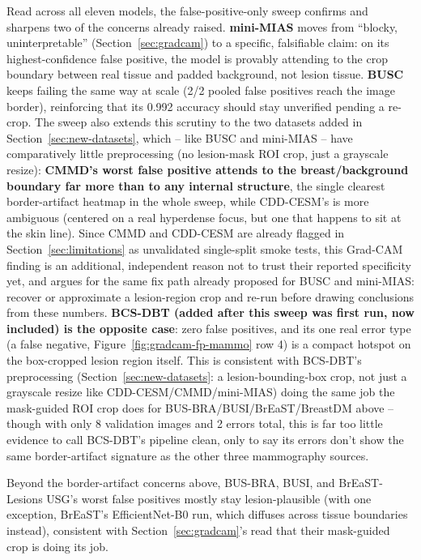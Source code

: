 \documentclass[11pt]{article}
\begin{document}
Read across all eleven models, the false-positive-only sweep confirms and
sharpens two of the concerns already raised. \textbf{mini-MIAS} moves from
``blocky, uninterpretable'' (Section~\ref{sec:gradcam}) to a specific,
falsifiable claim: on its highest-confidence false positive, the model is
provably attending to the crop boundary between real tissue and padded
background, not lesion tissue. \textbf{BUSC} keeps failing the same way at
scale (2/2 pooled false positives reach the image border), reinforcing that
its 0.992 accuracy should stay unverified pending a re-crop. The sweep also
extends this scrutiny to the two datasets added in
Section~\ref{sec:new-datasets}, which -- like BUSC and mini-MIAS -- have
comparatively little preprocessing (no lesion-mask ROI crop, just a
grayscale resize): \textbf{CMMD's worst false positive attends to the
breast/background boundary far more than to any internal structure},
the single clearest border-artifact heatmap in the whole sweep, while
CDD-CESM's is more ambiguous (centered on a real hyperdense focus, but one
that happens to sit at the skin line). Since CMMD and CDD-CESM are already
flagged in Section~\ref{sec:limitations} as unvalidated single-split smoke
tests, this Grad-CAM finding is an additional, independent reason not to
trust their reported specificity yet, and argues for the same fix path
already proposed for BUSC and mini-MIAS: recover or approximate a
lesion-region crop and re-run before drawing conclusions from these numbers.
\textbf{BCS-DBT (added after this sweep was first run, now included) is the
opposite case}: zero false positives, and its one real error type (a false
negative, Figure~\ref{fig:gradcam-fp-mammo} row 4) is a compact hotspot on
the box-cropped lesion region itself. This is consistent with BCS-DBT's
preprocessing (Section~\ref{sec:new-datasets}: a lesion-bounding-box crop,
not just a grayscale resize like CDD-CESM/CMMD/mini-MIAS) doing the same job
the mask-guided ROI crop does for BUS-BRA/BUSI/BrEaST/BreastDM above --
though with only 8 validation images and 2 errors total, this is far too
little evidence to call BCS-DBT's pipeline clean, only to say its errors
don't show the same border-artifact signature as the other three
mammography sources.

Beyond the border-artifact concerns above, BUS-BRA, BUSI, and
BrEaST-Lesions USG's worst false positives
mostly stay lesion-plausible (with one exception, BrEaST's
EfficientNet-B0 run, which diffuses across tissue boundaries instead),
consistent with Section~\ref{sec:gradcam}'s read that their mask-guided
crop is doing its job.
\end{document}
